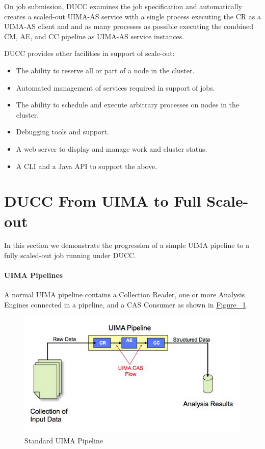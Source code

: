     On job submission, DUCC examines the job specification and automatically creates a scaled-out
    UIMA-AS service with a single process executing the CR as a UIMA-AS client and and as many
    processes as possible executing the combined CM, AE, and CC pipeline as UIMA-AS service
    instances.

    DUCC provides other facilities in support of scale-out:
    \begin{itemize}
      \item The ability to reserve all or part of a node in the cluster.
      \item Automated management of services required in support of jobs.
      \item The ability to schedule and execute arbitrary processes on nodes in the
        cluster.
      \item Debugging tools and support.
      \item A web server to display and manage work and cluster status.
      \item A CLI and a Java API to support the above.
    \end{itemize}
    
    \section{DUCC From UIMA to Full Scale-out}

    In this section we demonstrate the progression of a simple UIMA pipeline to a fully
    scaled-out job running under DUCC.

    \paragraph{UIMA Pipelines}
    A normal UIMA pipeline
    contains a Collection Reader, one or more Analysis Engines connected in a pipeline, and a CAS
    Consumer as shown in \hyperref[fig:UIMA-pipeline]{Figure ~\ref{fig:UIMA-pipeline}}.

    \begin{figure}[H]
      \centering
      \includegraphics[width=5.5in]{images/uima-pipeline.jpg}
      \caption{Standard UIMA Pipeline}
      \label{fig:UIMA-pipeline}
    \end{figure}

